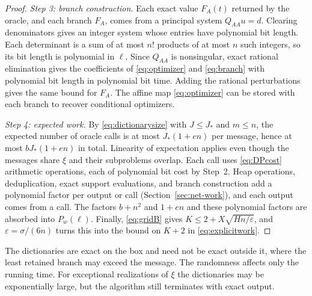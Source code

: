 \begin{proof}
\emph{Step 3: branch construction.} Each exact value $F_A(t)$ returned by
the oracle, and each branch $F_A$, comes from a principal system
$Q_{AA}u=d$. Clearing denominators gives an integer system whose entries
have polynomial bit length. Each determinant is a sum of at most $n!$
products of at most $n$ such integers, so its bit length is polynomial
in $\ell$. Since $Q_{AA}$ is nonsingular, exact rational elimination
gives the coefficients of \eqref{eq:optimizer} and \eqref{eq:branch} with
polynomial bit length in polynomial bit time. Adding the rational
perturbations gives the same bound for $F_A$. The affine map
\eqref{eq:optimizer} can be stored with each branch to recover
conditional optimizers.

\emph{Step 4: expected work.} By \eqref{eq:dictionarysize} with
$J\le J_*$ and $m\le n$, the expected number of oracle calls is at most
$J_*(1+en)$ per message, hence at most $bJ_*(1+en)$ in total. Linearity
of expectation applies even though the messages share $\xi$ and their
subproblems overlap. Each call uses \eqref{eq:DPcost} arithmetic
operations, each of polynomial bit cost by Step~2. Heap operations,
deduplication, exact support evaluations, and branch construction add a
polynomial factor per output or call (Section~\ref{sec:net-work}), and
each output comes from a call. The factors $b+n^2$ and $1+en$ and these
polynomial factors are absorbed into $P_w(\ell)$. Finally,
\eqref{eq:gridB} gives $K\le2+X\sqrt{Hn/\varepsilon}$, and
$\varepsilon=\sigma/(6n)$ turns this into the bound on $K+2$ in
\eqref{eq:explicitwork}.
\end{proof}

The dictionaries are exact on the box and need not be exact outside it,
where the least retained branch may exceed the message. The randomness
affects only the running time. For exceptional realizations of $\xi$ the
dictionaries may be exponentially large, but the algorithm still
terminates with exact output.

